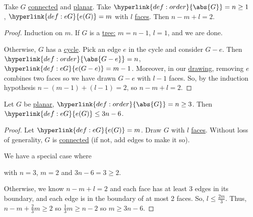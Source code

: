 \documentclass{article}
\begin{document}
\begin{nthm}\label{thm:23}
    Take $G$ \hyperlink{def:components}{connected} and \hyperlink{def:drawing}{planar}.
    Take $\hyperlink{def:order}{\abs{G}} = n \geq 1$, $\hyperlink{def:eG}{e(G)} = m$ with $l$ \hyperlink{def:face}{faces}.
    Then $n - m + l = 2$.
\end{nthm}

\begin{proof}
    Induction on $m$. If $G$ is a \hyperlink{def:tree}{tree:} $m = n-1$, $l = 1$, and we are done.

    Otherwise, $G$ has a \hyperlink{def:cycle}{cycle}.
    Pick an edge $e$ in the cycle and consider $G-e$. Then $\hyperlink{def:order}{\abs{G - e}} = n$, $\hyperlink{def:eG}{e(G-e)} = m-1$.
    Moreover, in our \hyperlink{def:drawing}{drawing}, removing $e$ combines two faces so we have drawn $G-e$ with $l-1$ faces.
    So, by the induction hypothesis $n - (m-1) + (l-1) = 2$, so $n - m + l = 2$.
\end{proof}

\begin{ncor}\label{cor:24}
    Let $G$ be \hyperlink{def:drawing}{planar}, $\hyperlink{def:order}{\abs{G}} = n \geq 3$. Then $\hyperlink{def:eG}{e(G)} \leq 3n-6$.
\end{ncor}

\begin{proof}
    Let $\hyperlink{def:eG}{e(G)} = m$. Draw $G$ with $l$ \hyperlink{def:face}{faces}.
    Without loss of generality, $G$ is \hyperlink{def:components}{connected} (if not, add edges to make it so).

    We have a special case where
    \begin{center}
    \end{center}
    with $n = 3$, $m = 2$ and $3n-6 = 3 \geq 2$.

    Otherwise, we know $n - m + l = 2$ and each face has at least 3 edges in its boundary, and each edge is in the boundary of at most 2 faces.
    So, $l \leq \frac{2m}{3}$.
    Thus, $n -m + \frac{2}{3}m \geq 2$ so $\frac{1}{3}m \geq n-2$ so $m \geq 3n-6.$
\end{proof}
\end{document}
